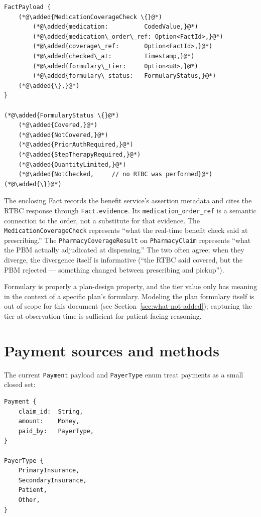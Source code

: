 \documentclass[11pt]{article}
\newcommand{\added}[1]{\textcolor{accentblue}{#1}}
\begin{document}
\begin{lstlisting}
FactPayload {
    (*@\added{MedicationCoverageCheck \{}@*)
        (*@\added{medication:          CodedValue,}@*)
        (*@\added{medication\_order\_ref: Option<FactId>,}@*)
        (*@\added{coverage\_ref:       Option<FactId>,}@*)
        (*@\added{checked\_at:         Timestamp,}@*)
        (*@\added{formulary\_tier:     Option<u8>,}@*)
        (*@\added{formulary\_status:   FormularyStatus,}@*)
    (*@\added{\},}@*)
}

(*@\added{FormularyStatus \{}@*)
    (*@\added{Covered,}@*)
    (*@\added{NotCovered,}@*)
    (*@\added{PriorAuthRequired,}@*)
    (*@\added{StepTherapyRequired,}@*)
    (*@\added{QuantityLimited,}@*)
    (*@\added{NotChecked,     // no RTBC was performed}@*)
(*@\added{\}}@*)
\end{lstlisting}

The enclosing Fact records the benefit service's assertion metadata and cites
the RTBC response through \texttt{Fact.evidence}. Its
\texttt{medication\_order\_ref} is a semantic connection to the order, not a
substitute for that evidence. The \texttt{MedicationCoverageCheck} represents
``what the real-time benefit check said at prescribing.'' The
\texttt{PharmacyCoverageResult} on \texttt{PharmacyClaim} represents
``what the PBM actually adjudicated at dispensing.'' The two often
agree; when they diverge, the divergence itself is informative
(``the RTBC said covered, but the PBM rejected --- something changed
between prescribing and pickup'').

Formulary is properly a plan-design property, and the tier value only
has meaning in the context of a specific plan's formulary. Modeling
the plan formulary itself is out of scope for this document
(see Section~\ref{sec:what-not-added}); capturing the tier at
observation time is sufficient for patient-facing reasoning.

\section{Payment sources and methods}
\label{sec:payment-sources}

The current \texttt{Payment} payload and \texttt{PayerType} enum treat
payments as a small closed set:

\begin{lstlisting}
Payment {
    claim_id:  String,
    amount:    Money,
    paid_by:   PayerType,
}

PayerType {
    PrimaryInsurance,
    SecondaryInsurance,
    Patient,
    Other,
}
\end{lstlisting}
\end{document}
